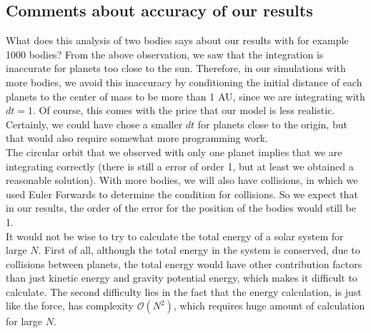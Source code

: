\subsection{Comments about accuracy of our results}
What does this analysis of two bodies says about our results with for example 1000 bodies? From the above observation, we saw that the integration is inaccurate for planets too close to the sun. Therefore, in our simulations with more bodies, we avoid this inaccuracy by conditioning the initial distance of each planets to the center of mass to be more than 1 AU, since we are integrating with $dt=1$. Of course, this comes with the price that our model is less realistic. Certainly, we could have chose a smaller $dt$ for planets close to the origin, but that would also require somewhat more programming work.\\

The circular orbit that we observed with only one planet implies that we are integrating correctly (there is still a error of order 1, but at least we obtained a reasonable solution). With more bodies, we will also have collisions, in which we used Euler Forwards to determine the condition for collisions. So we expect that in our results, the order of the error for the position of the bodies would still be 1.\\

It would not be wise to try to calculate the total energy of a solar system for large $N$. First of all, although the total energy in the system is conserved, due to collisions between planets, the total energy would have other contribution factors than just kinetic energy and gravity potential energy, which makes it difficult to calculate. The second difficulty lies in the fact that the energy calculation, is just like the force, has complexity $\mathcal{O}(N^2)$, which requires huge amount of calculation for large $N$.
